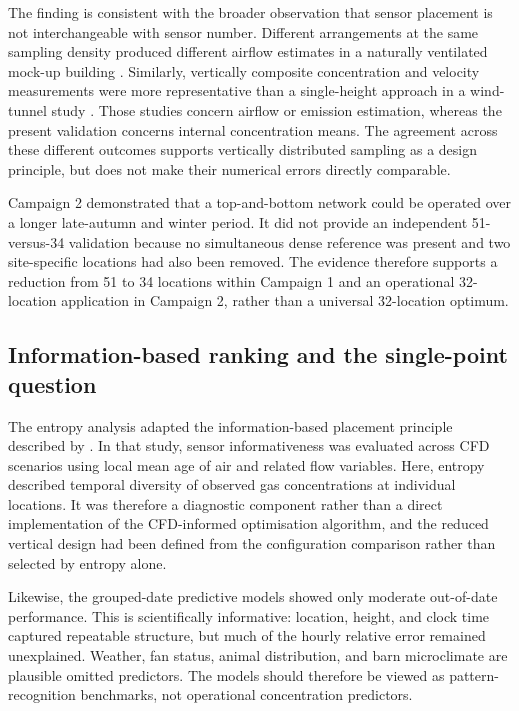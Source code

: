 \documentclass[12pt,a4paper]{article}
\begin{document}
The finding is consistent with the broader observation that sensor placement
is not interchangeable with sensor number. Different arrangements at the same
sampling density produced different airflow estimates in a naturally
ventilated mock-up building \citep{DeVogeleer2017}. Similarly, vertically
composite concentration and velocity measurements were more representative
than a single-height approach in a wind-tunnel study
\citep{Janke2020}. Those studies concern airflow or emission estimation,
whereas the present validation concerns internal concentration means. The
agreement across these different outcomes supports vertically distributed
sampling as a design principle, but does not make their numerical errors
directly comparable.

Campaign 2 demonstrated that a top-and-bottom network could be operated over
a longer late-autumn and winter period. It did not provide an independent
51-versus-34 validation because no simultaneous dense reference was present
and two site-specific locations had also been removed. The evidence therefore
supports a reduction from 51 to 34 locations within Campaign 1 and an
operational 32-location application in Campaign 2, rather than a universal
32-location optimum.

\subsection{Information-based ranking and the single-point question}

The entropy analysis adapted the information-based placement principle
described by \citet{Chen2026}. In that study,
sensor informativeness was evaluated across CFD scenarios using local mean age
of air and related flow variables. Here, entropy described temporal diversity
of observed gas concentrations at individual locations. It was therefore a
diagnostic component rather than a direct implementation of the CFD-informed
optimisation algorithm, and the reduced vertical design had been defined from
the configuration comparison rather than selected by entropy alone.

Likewise, the grouped-date predictive models showed only moderate out-of-date
performance. This is scientifically informative: location, height, and clock
time captured repeatable structure, but much of the hourly relative error
remained unexplained. Weather, fan status, animal distribution, and barn
microclimate are plausible omitted predictors. The models should therefore be
viewed as pattern-recognition benchmarks, not operational concentration
predictors.
\end{document}
